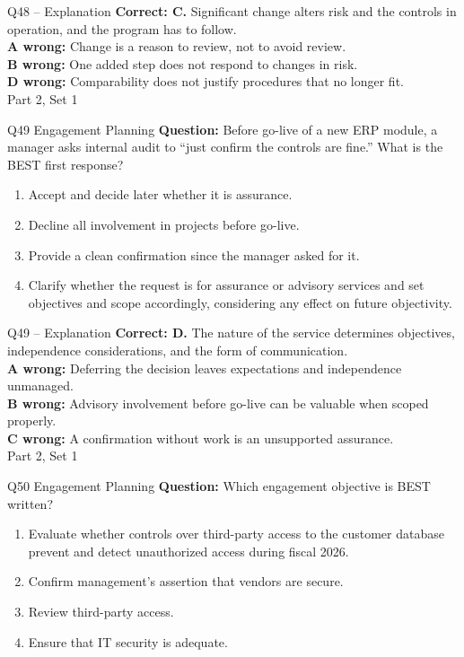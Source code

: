 \documentclass[aspectratio=169,10pt]{beamer}
\begin{document}
\begin{frame}[t]{Q48 -- Explanation}
	\footnotesize
	\textbf{Correct: C.} Significant change alters risk and the controls in operation, and the program has to follow. \\[5pt]
\textbf{A wrong:} Change is a reason to review, not to avoid review. \\[3pt]
\textbf{B wrong:} One added step does not respond to changes in risk. \\[3pt]
\textbf{D wrong:} Comparability does not justify procedures that no longer fit. \\[3pt]
	\vfill {\tiny Part 2, Set 1}
\end{frame}
\begin{frame}[t]{Q49 \hfill {\scriptsize Engagement Planning}}
	\small
	\textbf{Question:} Before go-live of a new ERP module, a manager asks internal audit to ``just confirm the controls are fine.'' What is the BEST first response?
	\begin{enumerate}[label=\Alph*.,itemsep=1pt,topsep=3pt]
			\item Accept and decide later whether it is assurance.
			\item Decline all involvement in projects before go-live.
			\item Provide a clean confirmation since the manager asked for it.
			\item Clarify whether the request is for assurance or advisory services and set objectives and scope accordingly, considering any effect on future objectivity.
	\end{enumerate}
\end{frame}
\begin{frame}[t]{Q49 -- Explanation}
	\footnotesize
	\textbf{Correct: D.} The nature of the service determines objectives, independence considerations, and the form of communication. \\[5pt]
\textbf{A wrong:} Deferring the decision leaves expectations and independence unmanaged. \\[3pt]
\textbf{B wrong:} Advisory involvement before go-live can be valuable when scoped properly. \\[3pt]
\textbf{C wrong:} A confirmation without work is an unsupported assurance. \\[3pt]
	\vfill {\tiny Part 2, Set 1}
\end{frame}
\begin{frame}[t]{Q50 \hfill {\scriptsize Engagement Planning}}
	\small
	\textbf{Question:} Which engagement objective is BEST written?
	\begin{enumerate}[label=\Alph*.,itemsep=1pt,topsep=3pt]
			\item Evaluate whether controls over third-party access to the customer database prevent and detect unauthorized access during fiscal 2026.
			\item Confirm management's assertion that vendors are secure.
			\item Review third-party access.
			\item Ensure that IT security is adequate.
	\end{enumerate}
\end{frame}
\end{document}
